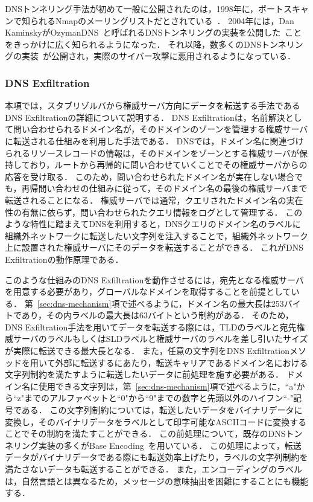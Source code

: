 DNSトンネリング手法が初めて一般に公開されたのは，1998年に，ポートスキャンで知られるNmapのメーリングリストだとされている~\cite{nmap, maarten}．
2004年には，Dan KaminskyがOzymanDNS~\cite{ozymandns}と呼ばれるDNSトンネリングの実装を公開した~\cite{dan-kaminsky}ことをきっかけに広く知られるようになった．
それ以降，数多くのDNSトンネリングの実装~\cite{heyoka, iodine, dnscat2, tcp-over-dns, dnscat, denise, dns-shell, dnsbotnet, dnscapy, dohtunnel, godoh, dohc2, magictunnelandroid, dns2tcp, tuns}が公開され，実際のサイバー攻撃に悪用されるようになっている．

\subsubsection{DNS Exfiltration}
\label{sec:dns-exfiltration}

本項では，スタブリゾルバから権威サーバ方向にデータを転送する手法であるDNS Exfiltrationの詳細について説明する．
DNS Exfiltrationは，名前解決として問い合わせられるドメイン名が，そのドメインのゾーンを管理する権威サーバに転送される仕組みを利用した手法である．
DNSでは，ドメイン名に関連づけられるリソースレコードの情報は，そのドメインをゾーンとする権威サーバが保持しており，ルートから再帰的に問い合わせていくことでその権威サーバからの応答を受け取る．
このため，問い合わせられたドメイン名が実在しない場合でも，再帰問い合わせの仕組みに従って，そのドメイン名の最後の権威サーバまで転送されることになる．
権威サーバでは通常，クエリされたドメイン名の実在性の有無に依らず，問い合わせられたクエリ情報をログとして管理する．
このような特性に踏まえてDNSを利用すると，DNSクエリのドメイン名のラベルに組織外ネットワークに転送したい文字列を注入することで，組織外ネットワーク上に設置された権威サーバにそのデータを転送することができる．
これがDNS Exfiltrationの動作原理である．

このような仕組みのDNS Exfiltrationを動作させるには，宛先となる権威サーバを用意する必要があり，グローバルなドメインを取得することを前提としている．
第~\ref{sec:dns-mechanism}項で述べるように，ドメイン名の最大長は253バイトであり，その内ラベルの最大長は63バイトという制約がある．
そのため，DNS Exfiltration手法を用いてデータを転送する際には，TLDのラベルと宛先権威サーバのラベルもしくはSLDラベルと権威サーバのラベルを差し引いたサイズが実際に転送できる最大長となる．
また，任意の文字列をDNS Exfiltrationメソッドを用いて外部に転送するにあたり，転送キャリアであるドメイン名における文字列制約を満たすように転送したいデータに前処理を施す必要がある．
ドメイン名に使用できる文字列は，第~\ref{sec:dns-mechanism}項で述べるように，``a"から``z"までのアルファベットと``0"から``9"までの数字と先頭以外のハイフン``-"記号である．
この文字列制約については，転送したいデータをバイナリデータに変換し，そのバイナリデータをラベルとして印字可能なASCIIコードに変換することでその制約を満たすことができる．
この前処理について，既存のDNSトンネリング実装の多くがBase Encoding~\cite{rfc4648}を用いている．
この処理によって，転送データがバイナリデータである際にも転送効率上げたり，ラベルの文字列制約を満たさないデータも転送することができる．
また，エンコーディングのラベルは，自然言語とは異なるため，メッセージの意味抽出を困難にすることにも機能する．

